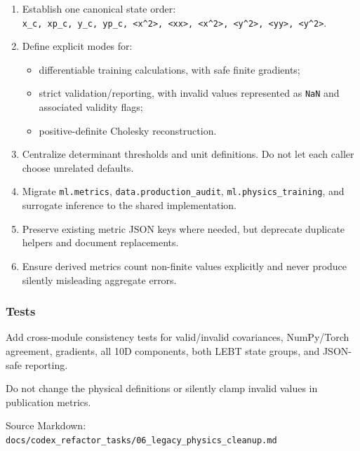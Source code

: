 \documentclass[
]{article}
\providecommand{\tightlist}{%
  \setlength{\itemsep}{0pt}\setlength{\parskip}{0pt}}
\begin{document}
\begin{enumerate}
\def\labelenumi{\arabic{enumi}.}
\tightlist
\item
  Establish one canonical state order:
  \texttt{x\_c,\ xp\_c,\ y\_c,\ yp\_c,\ \textless{}x\^{}2\textgreater{},\ \textless{}xx\textquotesingle{}\textgreater{},\ \textless{}x\textquotesingle{}\^{}2\textgreater{},\ \textless{}y\^{}2\textgreater{},\ \textless{}yy\textquotesingle{}\textgreater{},\ \textless{}y\textquotesingle{}\^{}2\textgreater{}}.
\item
  Define explicit modes for:

  \begin{itemize}
  \tightlist
  \item
    differentiable training calculations, with safe finite gradients;
  \item
    strict validation/reporting, with invalid values represented as
    \texttt{NaN} and associated validity flags;
  \item
    positive-definite Cholesky reconstruction.
  \end{itemize}
\item
  Centralize determinant thresholds and unit definitions. Do not let
  each caller choose unrelated defaults.
\item
  Migrate \texttt{ml.metrics}, \texttt{data.production\_audit},
  \texttt{ml.physics\_training}, and surrogate inference to the shared
  implementation.
\item
  Preserve existing metric JSON keys where needed, but deprecate
  duplicate helpers and document replacements.
\item
  Ensure derived metrics count non-finite values explicitly and never
  produce silently misleading aggregate errors.
\end{enumerate}

\hypertarget{tests-4}{%
\subsubsection{Tests}\label{tests-4}}

Add cross-module consistency tests for valid/invalid covariances,
NumPy/Torch agreement, gradients, all 10D components, both LEBT state
groups, and JSON-safe reporting.

Do not change the physical definitions or silently clamp invalid values
in publication metrics.

Source Markdown:
\texttt{docs/codex\_refactor\_tasks/06\_legacy\_physics\_cleanup.md}
\end{document}

